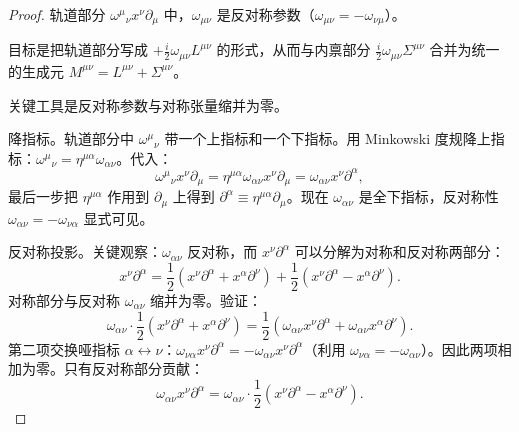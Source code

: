 \begin{proof}
轨道部分 $\omega^\mu{}_\nu x^\nu\partial_\mu$ 中，$\omega_{\mu\nu}$ 是反对称参数（$\omega_{\mu\nu}=-\omega_{\nu\mu}$）。

目标是把轨道部分写成 $+\frac{i}{2}\omega_{\mu\nu}L^{\mu\nu}$ 的形式，从而与内禀部分 $\frac{i}{2}\omega_{\mu\nu}\Sigma^{\mu\nu}$ 合并为统一的生成元 $M^{\mu\nu}=L^{\mu\nu}+\Sigma^{\mu\nu}$。

关键工具是反对称参数与对称张量缩并为零。

降指标。轨道部分中 $\omega^\mu{}_\nu$ 带一个上指标和一个下指标。用 Minkowski 度规降上指标：$\omega^\mu{}_\nu=\eta^{\mu\alpha}\omega_{\alpha\nu}$。代入：
\begin{equation*}
\omega^\mu{}_\nu x^\nu\partial_\mu=\eta^{\mu\alpha}\omega_{\alpha\nu}x^\nu\partial_\mu=\omega_{\alpha\nu}x^\nu\partial^\alpha,
\end{equation*}
最后一步把 $\eta^{\mu\alpha}$ 作用到 $\partial_\mu$ 上得到 $\partial^\alpha\equiv\eta^{\mu\alpha}\partial_\mu$。现在 $\omega_{\alpha\nu}$ 是全下指标，反对称性 $\omega_{\alpha\nu}=-\omega_{\nu\alpha}$ 显式可见。

反对称投影。关键观察：$\omega_{\alpha\nu}$ 反对称，而 $x^\nu\partial^\alpha$ 可以分解为对称和反对称两部分：
\begin{equation*}
x^\nu\partial^\alpha=\frac{1}{2}(x^\nu\partial^\alpha+x^\alpha\partial^\nu)+\frac{1}{2}(x^\nu\partial^\alpha-x^\alpha\partial^\nu).
\end{equation*}
对称部分与反对称 $\omega_{\alpha\nu}$ 缩并为零。验证：
\begin{equation*}
\omega_{\alpha\nu}\cdot\frac{1}{2}(x^\nu\partial^\alpha+x^\alpha\partial^\nu)=\frac{1}{2}(\omega_{\alpha\nu}x^\nu\partial^\alpha+\omega_{\alpha\nu}x^\alpha\partial^\nu).
\end{equation*}
第二项交换哑指标 $\alpha\leftrightarrow\nu$：$\omega_{\nu\alpha}x^\nu\partial^\alpha=-\omega_{\alpha\nu}x^\nu\partial^\alpha$（利用 $\omega_{\nu\alpha}=-\omega_{\alpha\nu}$）。因此两项相加为零。只有反对称部分贡献：
\begin{equation*}
\omega_{\alpha\nu}x^\nu\partial^\alpha=\omega_{\alpha\nu}\cdot\frac{1}{2}(x^\nu\partial^\alpha-x^\alpha\partial^\nu).
\end{equation*}


\end{proof}

